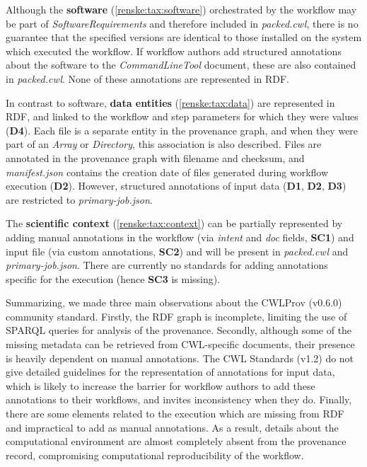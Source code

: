 Although the \textbf{software} (\ref{renske:tax:software}) orchestrated by the workflow may be part of \emph{SoftwareRequirements} and therefore included in \emph{packed.cwl}, there is no guarantee that the specified versions are identical to those installed on the system which executed the workflow. If workflow authors add structured annotations about the software to the \emph{CommandLineTool} document, these are also contained in \emph{packed.cwl}. None of these annotations are represented in RDF.

In contrast to software, \textbf{data entities} (\ref{renske:tax:data}) are represented in RDF, and linked to the workflow and step parameters for which they were values (\textbf{D4}). Each file is a separate entity in the provenance graph, and when they were part of an \emph{Array} or \emph{Directory}, this association is also described. Files are annotated in the provenance graph with filename and checksum, and \emph{manifest.json} contains the creation date of files generated during workflow execution (\textbf{D2}). However, structured annotations of input data (\textbf{D1}, \textbf{D2}, \textbf{D3}) are restricted to \emph{primary-job.json}.

The \textbf{scientific context} (\ref{renske:tax:context}) can be partially represented by adding manual annotations in the workflow (via \emph{intent} and \emph{doc} fields, \textbf{SC1}) and input file (via custom annotations, \textbf{SC2}) and will be present in \emph{packed.cwl} and \emph{primary-job.json}. There are currently no standards for adding annotations specific for the execution (hence \textbf{SC3} is missing). 

Summarizing, we made three main observations about the CWLProv (v0.6.0) community standard. Firstly, the RDF graph is incomplete, limiting the use of SPARQL queries for analysis of the provenance. Secondly, although some of the missing metadata can be retrieved from CWL-specific documents, their presence is heavily dependent on manual annotations. The CWL Standards (v1.2) do not give detailed guidelines for the representation of annotations for input data, which is likely to increase the barrier for workflow authors to add these annotations to their workflows, and invites inconsistency when they do. Finally, there are some elements related to the execution which are missing from RDF and impractical to add as manual annotations. As a result, details about the computational environment are almost completely absent from the provenance record, compromising computational reproducibility of the workflow. 

